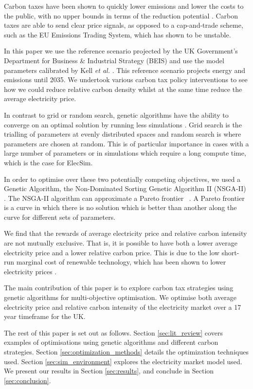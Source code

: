 \documentclass[sigconf]{acmart}
\begin{document}
Carbon taxes have been shown to quickly lower emissions and lower the costs to the public, with no upper bounds in terms of the reduction potential \cite{Wittneben2009}. Carbon taxes are able to send clear price signals, as opposed to a cap-and-trade scheme, such as the EU Emissions Trading System, which has shown to be unstable.

In this paper we use the reference scenario projected by the UK Government's Department for Business \& Industrial Strategy (BEIS) and use the model parameters calibrated by Kell \textit{et al.} \cite{DBEIS2019,Kell2020}. This reference scenario projects energy and emissions until 2035. We undertook various carbon tax policy interventions to see how we could reduce relative carbon density whilst at the same time reduce the average electricity price.


In contrast to grid or random search, genetic algorithms have the ability to converge on an optimal solution by running less simulations \cite{Bergstra2012}. Grid search is the trialling of parameters at evenly distributed spaces and random search is where parameters are chosen at random. This is of particular importance in cases with a large number of parameters or in simulations which require a long compute time, which is the case for ElecSim.

In order to optimise over these two potentially competing objectives, we used a Genetic Algorithm, the Non-Dominated Sorting Genetic Algorithm II (NSGA-II) \cite{Valkanas2014}. The NSGA-II algorithm can approximate a Pareto frontier ~\cite{Pareto1927, Stadler1979}. A Pareto frontier is a curve in which there is no solution which is better than another along the curve for different sets of parameters.

We find that the rewards of average electricity price and relative carbon intensity are not mutually exclusive. That is, it is possible to have both a lower average electricity price and a lower relative carbon price. This is due to the low short-run marginal cost of renewable technology, which has been shown to lower electricity prices \cite{OMahoney2011}.

The main contribution of this paper is to explore carbon tax strategies using genetic algorithms for multi-objective optimisation. We optimise both average electricity price and relative carbon intensity of the electricity market over a 17 year timeframe for the UK.

The rest of this paper is set out as follows. Section \ref{sec:lit_review} covers examples of optimisations using genetic algorithms and different carbon strategies. Section \ref{sec:optimization_methods} details the optimization techniques used. Section \ref{sec:sim_environment} explores the electricity market model used. We present our results in Section \ref{sec:results}, and conclude in Section \ref{sec:conclusion}.
\end{document}
